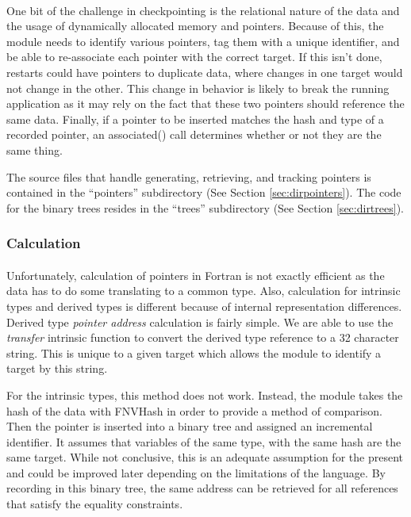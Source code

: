 \documentclass{article}
\begin{document}
\paragraph{}
One bit of the challenge in checkpointing is the relational nature of the data and the usage of dynamically allocated memory and pointers. Because of this, the module needs to identify various pointers, tag them with a unique identifier, and be able to re-associate each pointer with the correct target. If this isn't done, restarts could have pointers to duplicate data, where changes in one target would not change in the other. This change in behavior is likely to break the running application as it may rely on the fact that these two pointers should reference the same data. Finally, if a pointer to be inserted matches the hash and type of a recorded pointer, an associated() call determines whether or not they are the same thing.

The source files that handle generating, retrieving, and tracking pointers is contained in the ``pointers'' subdirectory (See Section \ref{sec:dirpointers}). The code for the binary trees resides in the ``trees'' subdirectory (See Section \ref{sec:dirtrees}).

\subsubsection{Calculation}
\paragraph{}
Unfortunately, calculation of pointers in Fortran is not exactly efficient as the data has to do some translating to a common type. Also, calculation for intrinsic types and derived types is different because of internal representation differences. Derived type \emph{pointer address} calculation is fairly simple. We are able to use the \emph{transfer} intrinsic function to convert the derived type reference to a 32 character string. This is unique to a given target which allows the module to identify a target by this string. 

For the intrinsic types, this method does not work. Instead, the module takes the hash of the data with FNVHash in order to provide a method of comparison. Then the pointer is inserted into a binary tree and assigned an incremental identifier. It assumes that variables of the same type, with the same hash are the same target. While not conclusive, this is an adequate assumption for the present and could be improved later depending on the limitations of the language. By recording in this binary tree, the same address can be retrieved for all references that satisfy the equality constraints.
\end{document}
